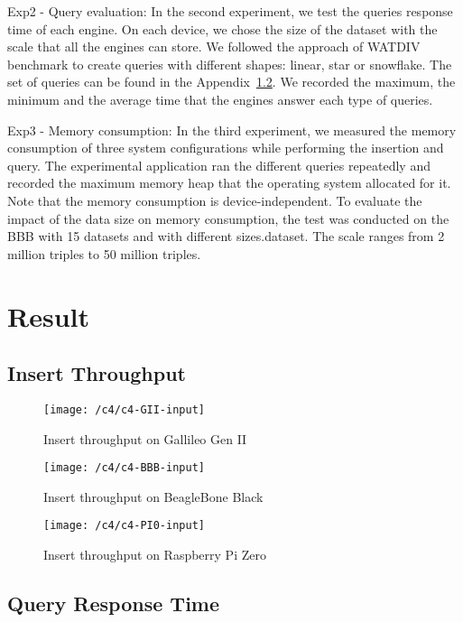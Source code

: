 {Exp2 - Query evaluation:} 
In the second experiment, we test the queries response time of each engine.
On each device, we chose the size of the dataset with the scale that all the engines can store.
We followed the approach of WATDIV benchmark to create queries with different shapes: linear, star or snowflake.
The set of queries can be found in the Appendix~\ref{}.
We recorded the maximum, the minimum and the average time that the engines answer each type of queries.

{Exp3 - Memory consumption:}
In the third experiment, we measured the memory consumption of three system configurations while performing the insertion and query.  
The experimental application ran the different queries repeatedly and recorded the maximum memory heap that the operating system allocated for it. 
Note that the memory consumption is device-independent. 
To evaluate the impact of the data size on memory consumption, the test was conducted on the BBB with 15 datasets and with different sizes.dataset. 
The scale ranges from 2 million triples to 50 million triples. 

\section{Result}

\subsection{Insert Throughput}


\newpage

\begin{figure}[ht!]
    \centering
    \texttt{[image: /c4/c4-GII-input]}
    \caption{Insert throughput on Gallileo Gen II}
    \label{fig:4-3-GII}
\end{figure}

\begin{figure}[ht!]
    \centering
    \texttt{[image: /c4/c4-BBB-input]}
    \caption{Insert throughput on BeagleBone Black}
    \label{fig:4-3-BBB}
\end{figure}

\begin{figure}[ht!]
    \centering
    \texttt{[image: /c4/c4-PI0-input]}
    \caption{Insert throughput on Raspberry Pi Zero}
    \label{fig:4-3-PI0}
\end{figure}
\newpage


\subsection{Query Response Time}

